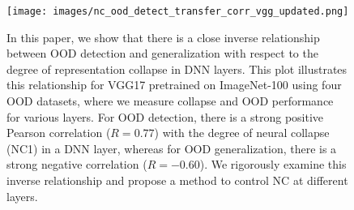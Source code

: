 
\begin{figure}[t]
    \centering
    \texttt{[image: images/nc\_ood\_detect\_transfer\_corr\_vgg\_updated.png]}
  \caption{In this paper, we show that there is a close inverse relationship between OOD detection and generalization with respect to the degree of representation collapse in DNN layers. This plot illustrates this relationship for VGG17 pretrained on ImageNet-100 using four OOD datasets, where we measure collapse and OOD performance for various layers. For OOD detection, there is a strong positive Pearson correlation ($R=0.77$) with the degree of neural collapse (NC1) in a DNN layer, whereas for OOD generalization, there is a strong negative correlation ($R=-0.60$). We rigorously examine this inverse relationship and propose a method to control NC at different layers. %
  } 
  \label{fig:vis_abstract}
  \vspace{-0.21in}
\end{figure}







